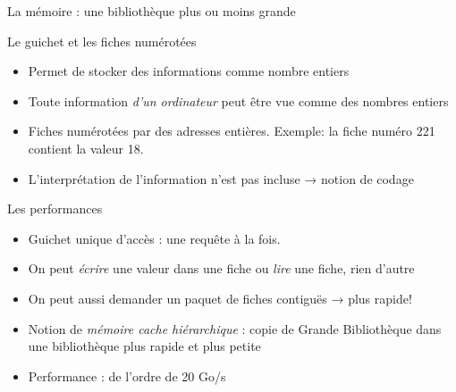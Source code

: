 \begin{frame}{La mémoire : une bibliothèque plus ou moins grande}
  \begin{block}{Le guichet et les fiches numérotées}
    \begin{itemize}
    \item Permet de stocker des informations comme nombre entiers
    \item[\dialoginformation] Toute information \emph{d'un ordinateur} peut être vue comme des nombres entiers
    \item Fiches numérotées par des adresses entières. Exemple: la fiche numéro 221 contient la valeur 18.
    \item[\dialogwarning] L'interprétation de l'information n'est pas incluse → notion de codage
    \end{itemize}
  \end{block}
  \begin{block}{Les performances}
    \begin{itemize}
    \item Guichet unique d'accès : une requête à la fois.
    \item On peut \emph{écrire} une valeur dans une fiche ou \emph{lire} une fiche, rien d'autre
    \item[\dialogsystem] On peut aussi demander un paquet de fiches contiguës → plus rapide!
    \item Notion de \emph{mémoire cache hiérarchique} : copie de Grande Bibliothèque dans une bibliothèque plus rapide et plus petite
    \item Performance : de l'ordre de 20 Go/s
    \end{itemize}
  \end{block}
\end{frame}

